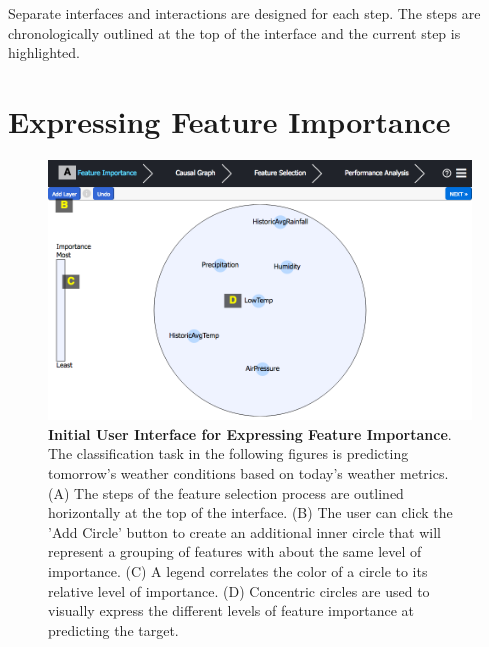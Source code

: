 Separate interfaces and interactions are designed for each step. The steps are chronologically outlined at the top of the interface and the current step is highlighted. 

\section{Expressing Feature Importance}

\begin{figure}[!htbp]
\centering
\includegraphics[width=1\textwidth]{InitialUserInterface}
\caption{\textbf{Initial User Interface for Expressing Feature Importance}. The classification task in the following figures is predicting tomorrow's weather conditions based on today's weather metrics. (A) The steps of the feature selection process are outlined horizontally at the top of the interface. (B) The user can click the 'Add Circle' button to create an additional inner circle that will represent a grouping of features with about the same level of importance. (C) A legend correlates the color of a circle to its relative level of importance. (D) Concentric circles are used to visually express the different levels of feature importance at predicting the target. }\label{fig:InitialUserInterface}
\end{figure}
 
